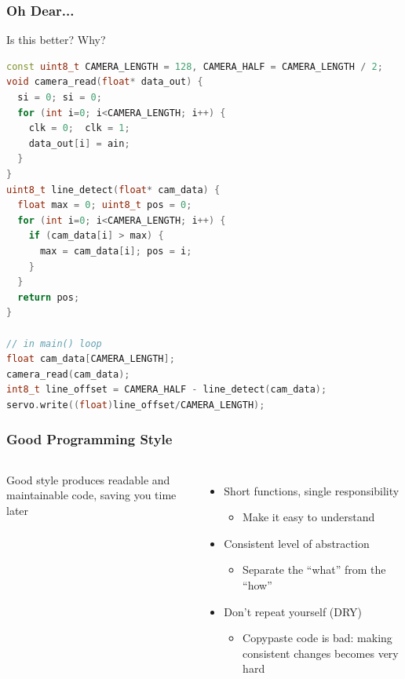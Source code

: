 \documentclass{beamer}
\begin{document}
\begin{frame}[fragile]
\frametitle{Oh Dear...}
Is this better? Why?
\begin{lstlisting}[language=C++,basicstyle=\ttfamily\tiny]
const uint8_t CAMERA_LENGTH = 128, CAMERA_HALF = CAMERA_LENGTH / 2;
void camera_read(float* data_out) {
  si = 0; si = 0;
  for (int i=0; i<CAMERA_LENGTH; i++) {
    clk = 0;  clk = 1;
    data_out[i] = ain;
  }
}
uint8_t line_detect(float* cam_data) {
  float max = 0; uint8_t pos = 0;
  for (int i=0; i<CAMERA_LENGTH; i++) {
    if (cam_data[i] > max) {
      max = cam_data[i]; pos = i;
    }
  }
  return pos;
}

// in main() loop
float cam_data[CAMERA_LENGTH];
camera_read(cam_data);
int8_t line_offset = CAMERA_HALF - line_detect(cam_data);
servo.write((float)line_offset/CAMERA_LENGTH);
\end{lstlisting}
\end{frame}


\begin{frame}
\frametitle{Good Programming Style}
\begin{columns}[t]
Good style produces readable and maintainable code, saving you time later
\begin{itemize}
  \item Short functions, single responsibility
  \begin{itemize}
    \item Make it easy to understand
  \end{itemize}
  \item Consistent level of abstraction
  \begin{itemize}
    \item Separate the ``what'' from the ``how''
  \end{itemize}
  \item Don't repeat yourself (DRY)
  \begin{itemize}
    \item Copypaste code is bad: making consistent changes becomes very hard
  \end{itemize}
\end{itemize}

\end{columns}
\end{frame}
\end{document}
